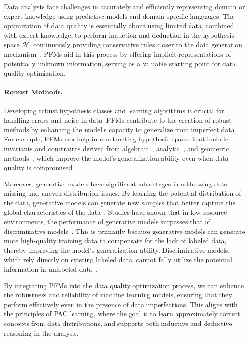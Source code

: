   Data analysts face challenges in accurately and efficiently representing domain or expert knowledge using predictive models and domain-specific languages. The optimization of data quality is essentially about using limited data, combined with expert knowledge, to perform induction and deduction in the hypothesis space $\mathcal{H}$, continuously providing conservative rules closer to the data generation mechanism~\cite{peng2022self}. PFMs aid in this process by offering implicit representations of potentially unknown information, serving as a valuable starting point for data quality optimization.
  
  \paragraph{Robust Methods.}
  
  Developing robust hypothesis classes and learning algorithms is crucial for handling errors and noise in data. PFMs contribute to the creation of robust methods by enhancing the model's capacity to generalize from imperfect data. For example, PFMs can help in constructing hypothesis spaces that include invariants and constraints derived from algebraic~\cite{Miao2022LearningIA}, analytic~\cite{Neu2022GeneralizationBV}, and geometric methods~\cite{Atzeni2023InfusingLS}, which improve the model's generalization ability even when data quality is compromised.
  
  Moreover, generative models have significant advantages in addressing data missing and uneven distribution issues. By learning the potential distribution of the data, generative models can generate new samples that better capture the global characteristics of the data~\cite{094dai2017good}. Studies have shown that in low-resource environments, the performance of generative models surpasses that of discriminative models~\cite{097yoon2017semi}. This is primarily because generative models can generate more high-quality training data to compensate for the lack of labeled data, thereby improving the model's generalization ability. Discriminative models, which rely directly on existing labeled data, cannot fully utilize the potential information in unlabeled data~\cite{102yang2018deep}.
  
  By integrating PFMs into the data quality optimization process, we can enhance the robustness and reliability of machine learning models, ensuring that they perform effectively even in the presence of data imperfections. This aligns with the principles of PAC learning, where the goal is to learn approximately correct concepts from data distributions, and supports both inductive and deductive reasoning in the analysis.
  
